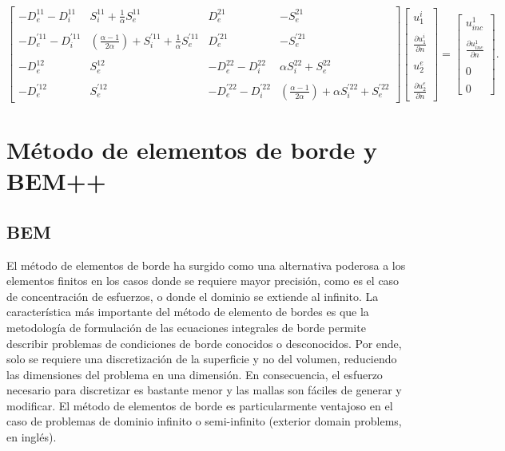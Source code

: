 \documentclass[12pt,letterpaper]{article}
\numberwithin{equation}{section}
\begin{document}
\begin{equation} 
\begin{bmatrix}
-D_{e}^{11} - D_{i}^{11} & S_{i}^{11} + \frac{1}{\alpha}S_{e}^{11} & D_{e}^{21} & -S_{e}^{21} \\
\\
-D_{e}^{'11} - D_{i}^{'11} & (\frac{\alpha - 1}{2\alpha})+ S_{i}^{'11} + \frac{1}{\alpha}S_{e}^{'11} & D_{e}^{'21} & -S_{e}^{'21}\\
\\
-D_{e}^{12} & S_{e}^{12} & -D_{e}^{22} - D_{i}^{22} & \alpha S_{i}^{22} + S_{e}^{22}\\
\\
-D_{e}^{'12} & S_{e}^{'12} & -D_{e}^{'22} - D_{i}^{'22} & (\frac{\alpha - 1}{2\alpha})+\alpha S_{i}^{'22} + S_{e}^{'22}
\end{bmatrix}
\begin{bmatrix}
u^{i}_1\\
\\
\frac{\partial u^{i}_1}{\partial n}\\
\\
u^{e}_2\\
\\
\frac{\partial u^{e}_2}{\partial n}
\end{bmatrix}
=
\begin{bmatrix}
u_{inc}^1\\
\\
\frac{\partial u_{inc}^1}{\partial n}\\
\\
0\\
\\
0
\end{bmatrix}.
\label{eq:multi2_matriz int}		 
\end{equation} 





\section{Método de elementos de borde y BEM++}
\subsection{BEM}

El método de elementos de borde ha surgido como una alternativa poderosa a los elementos finitos en los casos donde se requiere mayor precisión, como es el caso de concentración de esfuerzos, o donde el dominio se extiende al infinito. La característica más importante del método de elemento de bordes es que la metodología de formulación de las ecuaciones integrales de borde permite describir problemas de condiciones de borde conocidos o desconocidos. Por ende, solo se requiere una discretización de la superficie y no del volumen, reduciendo las dimensiones del problema en una dimensión. En consecuencia, el esfuerzo necesario para discretizar es bastante menor y las mallas son fáciles de generar y modificar.
El método de elementos de borde es particularmente ventajoso en el caso de problemas de dominio infinito o semi-infinito (exterior domain problems, en inglés).
\end{document}
